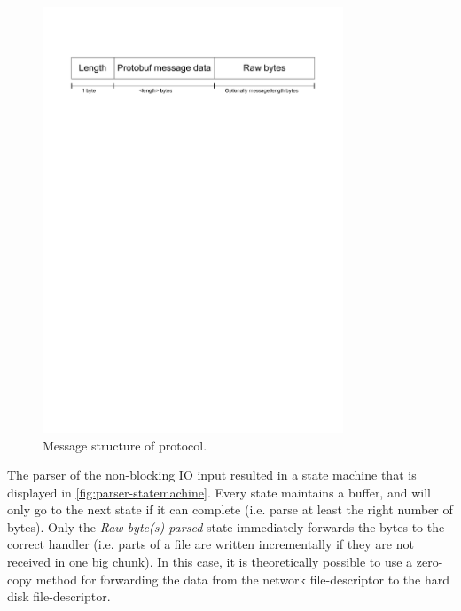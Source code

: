 \documentclass[12pt,a4paper]{scrartcl}
\begin{document}
\begin{figure}[H]
\centering
\includegraphics[width=0.8\textwidth,trim=0 23cm 0 3cm,clip=true]{diagrams/message-structure.pdf}
\caption{Message structure of protocol.}
\label{fig:message-structure}
\end{figure}

The parser of the non-blocking IO input resulted in a state machine that is displayed in \autoref{fig:parser-statemachine}. Every state maintains a buffer, and will only go to the next state if it can complete (i.e. parse at least the right number of bytes). Only the \emph{Raw byte(s) parsed} state immediately forwards the bytes to the correct handler (i.e. parts of a file are written incrementally if they are not received in one big chunk). In this case, it is theoretically possible to use a zero-copy method for forwarding the data from the network file-descriptor to the hard disk file-descriptor.
\end{document}
